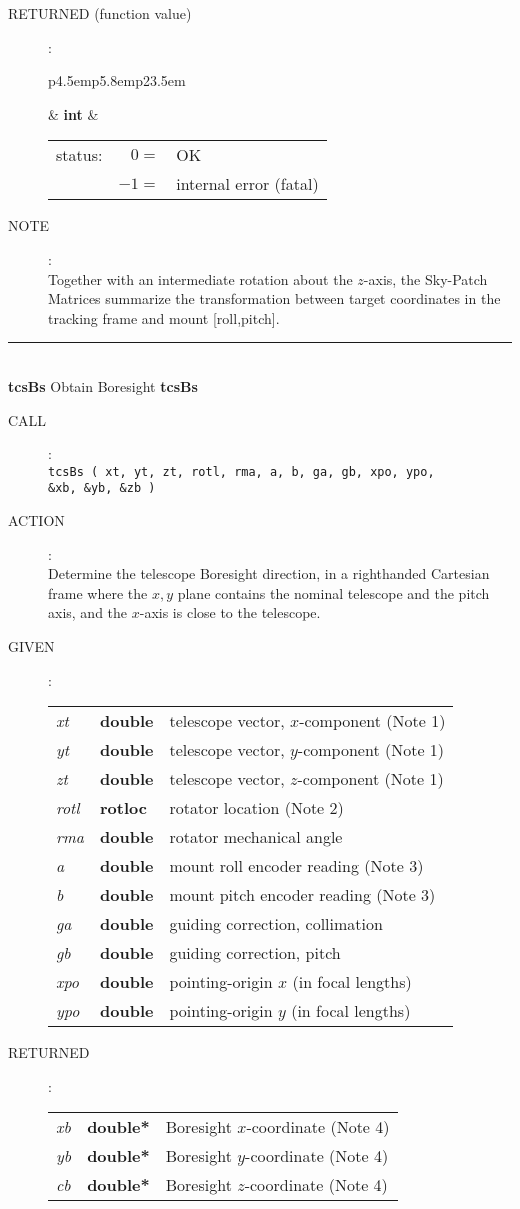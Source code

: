 \documentclass[12pt,fleqn,twoside]{article}
\renewcommand{\_}{{\tt\char'137}}     %
\newcommand{\routine}[2]
{
  \newpage
  \rule{\textwidth}{0.3mm}\\ \nopagebreak
  {\Large {\bf #1} \hfill #2 \hfill {\bf #1}}
  \vspace{-1ex}
}
\newcommand{\call}[1]
{
  \goodbreak
  \begin{description}
    \item[CALL]: \\[0.5ex] \nopagebreak
        {\tt #1}
  \end{description}
  \vspace{-3ex}
}
\newcommand{\action}[1]
{
  \goodbreak
  \begin{description}
    \item[ACTION]: \\[0.5ex] \nopagebreak
        #1
  \end{description}
  \vspace{-3ex}
}
\newcommand{\args}[2]
{
  \goodbreak
  \begin{description}
  \item[#1]: \\[1.5ex] \nopagebreak
    \hspace*{-0.9em}
    \begin{tabular}{p{4.5em}p{5.8em}p{23.5em}}
      #2
    \end{tabular}
  \end{description}
  \vspace{-3ex}
}
\newcommand{\spec}[3]
{
  {\em {#1}} & {\bf \mbox{#2}} & {#3}
}
\newcommand{\anote}[1]
{
  \goodbreak
  \begin{description}
    \item[NOTE]: \\[0.5ex] \nopagebreak
        #1
  \end{description}
  \vspace{-3ex}
}
\begin{document}
\args{RETURNED \rm (function value)}
{
\spec{}{int}{\hspace{-1.8ex}
             \begin{tabular}[t]{lrl}
                status: & $  0 = $ & OK \\
                        & $ -1 = $ & internal error (fatal) \\
             \end{tabular}
            }
}
\anote{Together with an intermediate
       rotation about the $z$-axis, the Sky-Patch Matrices
       summarize the
       transformation between target coordinates in the tracking frame
       and mount [roll,pitch].}
\routine{tcsBs}{Obtain {\sc Boresight}}
\label{tcsBs}
\call{tcsBs ( xt, yt, zt, rotl, rma, a, b, ga, gb, xpo, ypo, \\
\hspace*{3.6em} \&xb, \&yb, \&zb ) }
\action{Determine the telescope {\sc Boresight} direction, in a righthanded
        Cartesian frame where the $x,y$ plane contains the nominal telescope
        and the pitch axis, and the $x$-axis is close to the telescope.}
\args{GIVEN}
{
\spec{xt}{double}{telescope vector, $x$-component (Note 1)} \\
\spec{yt}{double}{telescope vector, $y$-component (Note 1)} \\
\spec{zt}{double}{telescope vector, $z$-component (Note 1)} \\
\spec{rotl}{\sc rotloc}{rotator location (Note 2)} \\
\spec{rma}{double}{rotator mechanical angle} \\
\spec{a}{double}{mount roll encoder reading (Note 3)} \\
\spec{b}{double}{mount pitch encoder reading (Note 3)} \\
\spec{ga}{double}{guiding correction, collimation} \\
\spec{gb}{double}{guiding correction, pitch} \\
\spec{xpo}{double}{pointing-origin $x$ (in focal lengths)} \\
\spec{ypo}{double}{pointing-origin $y$ (in focal lengths)}
}
\args{RETURNED}
{
\spec{xb}{double*}{{\sc Boresight} $x$-coordinate (Note 4)} \\
\spec{yb}{double*}{{\sc Boresight} $y$-coordinate (Note 4)} \\
\spec{cb}{double*}{{\sc Boresight} $z$-coordinate (Note 4)}
}
\end{document}
